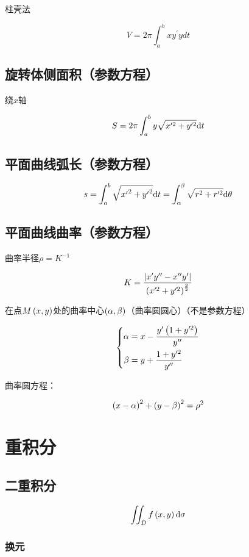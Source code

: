 \documentclass{article}
\begin{document}
柱壳法

\[V=2\pi\int_a^bxy^\prime ydt\]

\subsection{旋转体侧面积（参数方程）}

绕$x$轴

\[S=2\pi\int_a^b{y\sqrt{x^{\prime2}+y^{\prime2}}\mathrm d t}\]

\subsection{平面曲线弧长（参数方程）}

\[s=\int_a^b{\sqrt{{x^\prime}^2+{y^\prime}^2}\mathrm d t}=\int_{\alpha}^{\beta}{\sqrt{r^2+r^{\prime2}}\mathrm d\theta}\]

\subsection{平面曲线曲率（参数方程）}

曲率半径$\rho=K^{-1}$

\[K=\frac{\left|x^\prime y^{\prime\prime}-x^{\prime\prime}y^\prime\right|}{\left(x^{\prime2}+y^{\prime2}\right)^\frac32}\]

在点$M\left(x,y\right)$处的曲率中心$\left(\alpha,\beta\right)$（曲率圆圆心）（不是参数方程）

\[\left\{\begin{aligned}
        \alpha & =x-\frac{y^\prime\left(1+y^{\prime2}\right)}{y^{\prime\prime}} \\
        \beta  & =y+\frac{1+y^{\prime2}}{y^{\prime\prime}}
    \end{aligned}\right.\]

曲率圆方程：

\[\left(x-\alpha\right)^2+\left(y-\beta\right)^2=\rho^2\]

\section{重积分}

\subsection{二重积分}

\begin{definition}[$\d\sigma=\d x\d y$]
    \[\iint_Df\left(x,y\right)\mathrm d\sigma\]
\end{definition}

\subsubsection{换元}
\end{document}
